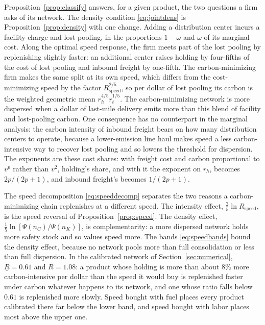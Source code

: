\documentclass[11pt]{article}
\theoremstyle{definition}
\theoremstyle{remark}
\theoremstyle{plain}
\begin{document}
\noindent Proposition~\ref{prop:classify} answers, for a given product, the two questions a firm asks of its
network. The density condition \eqref{eq:jointdens} is Proposition~\ref{prop:density} with one change.
Adding a distribution center incurs a facility charge and lost pooling, in the proportions $1-\omega$ and
$\omega$ of its marginal cost. Along the optimal speed response, the firm meets part of the lost pooling by
replenishing slightly faster: an additional center raises holding by four-fifths of the cost of lost pooling and
inbound freight by one-fifth. The carbon-minimizing firm makes the same split at its own speed, which differs
from the cost-minimizing speed by the factor $R_{\mathrm{speed}}^{2/5}$, so per dollar of lost pooling its
carbon is the weighted geometric mean $r_h^{4/5}r_t^{1/5}$. The carbon-minimizing network is more dispersed when
a dollar of last-mile delivery emits more than this blend of facility and lost-pooling carbon. One consequence
has no counterpart in the marginal analysis: the carbon intensity of inbound freight bears on how many
distribution centers to operate, because a lower-emission line haul makes speed a less carbon-intensive way to
recover lost pooling and so lowers the threshold for dispersion. The exponents are these cost shares: with
freight cost and carbon proportional to $v^{p}$ rather than $v^2$, holding's share, and with it the exponent on
$r_h$, becomes $2p/(2p+1)$, and inbound freight's becomes $1/(2p+1)$.

\noindent The speed decomposition \eqref{eq:speeddecomp} separates the two reasons a carbon-minimizing chain
replenishes at a different speed. The intensity effect, $\tfrac25\ln R_{\mathrm{speed}}$, is the speed reversal
of Proposition~\ref{prop:speed}. The density effect, $\tfrac15\ln[\Psi(n_C)/\Psi(n_K)]$, is complementarity: a
more dispersed network holds more safety stock and so values speed more. The bands \eqref{eq:speedbands} bound
the density effect, because no network pools more than full consolidation or less than full dispersion. In the
calibrated network of Section~\ref{sec:numerical}, $\underline R=0.61$ and $\overline R=1.08$: a product whose
holding is more than about $8\%$ more carbon-intensive per dollar than the speed it would buy is replenished
faster under carbon whatever happens to its network, and one whose ratio falls below $0.61$ is replenished more
slowly. Speed bought with fuel places every product calibrated there far below the lower band, and speed
bought with labor places most above the upper one.
\end{document}
